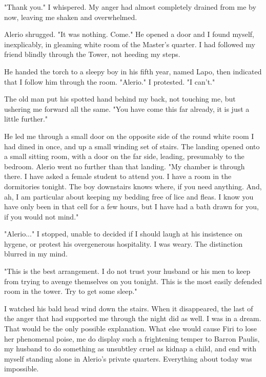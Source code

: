 \documentclass{article}
\begin{document}
"Thank you." I whispered. My anger had almost completely drained from me by now, leaving me shaken and overwhelmed.

Alerio shrugged. "It was nothing. Come." He opened a door and I found myself, inexplicably, in gleaming white room of the Master's quarter. I had followed my friend blindly through the Tower, not heeding my steps.

He handed the torch to a sleepy boy in his fifth year, named Lapo, then indicated that I follow him through the room. "Alerio." I protested. "I can't."

The old man put his spotted hand behind my back, not touching me, but ushering me forward all the same. "You have come this far already, it is just a little further."

He led me through a small door on the opposite side of the round white room I had dined in once, and up a small winding set of stairs. The landing opened onto a small sitting room, with a door on the far side, leading, presumably to the bedroom. Alerio went no further than that landing. "My chamber is through there. I have asked a female student to attend you. I have a room in the dormitories tonight. The boy downstairs knows where, if you need anything. And, ah, I am particular about keeping my bedding free of lice and fleas. I know you have only been in that cell for a few hours, but I have had a bath drawn for you, if you would not mind."

"Alerio..." I stopped, unable to decided if I should laugh at his insistence on hygene, or protest his overgenerous hospitality. I was weary. The distinction blurred in my mind.

"This is the best arrangement. I do not trust your husband or his men to keep from trying to avenge themselves on you tonight. This is the most easily defended room in the tower. Try to get some sleep."

I watched his bald head wind down the stairs. When it disappeared, the last of the anger that had supported me through the night did as well. I was in a dream. That would be the only possible explanation. What else would cause Firi to lose her phenomenal poise, me do display such a frightening temper to Barron Paulis, my husband to do something as unsubtley cruel as kidnap a child, and end with myself standing alone in Alerio's private quarters. Everything about today was impossible. 
\end{document}
